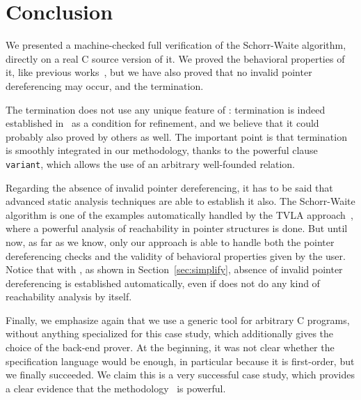 \section{Conclusion}
\label{sec:conclusion}

We presented a machine-checked full verification of the Schorr-Waite
algorithm, directly on a real C source version of it. We 
proved the behavioral properties of it, like previous
works~\cite{bornat00mpc,mehta03cade,abrial03fme}, but we have also
proved that no invalid pointer dereferencing may occur, and the
termination.

The termination does not use any unique feature of \caduceus{}:
termination is indeed established in~\cite{abrial03fme} as a condition
for refinement, and we believe that it could probably also proved by
others as well. The important point is that termination is smoothly
integrated in our methodology, thanks to the powerful clause
\texttt{variant}, which allows the use of an arbitrary well-founded
relation.

Regarding the absence of invalid pointer dereferencing, it has to be
said that advanced static analysis techniques are able to establish it
also. The Schorr-Waite algorithm is one of the examples automatically
handled by the TVLA approach~\cite{sagiv02toplas,reps03esop}, where a powerful
analysis of reachability in pointer structures is done. But until now,
as far as we know, only our approach is able to handle both the pointer
dereferencing checks and the validity of behavioral properties given
by the user. Notice that with \caduceus, as shown in
Section~\ref{sec:simplify}, absence of invalid pointer dereferencing
is established automatically, even if \caduceus{} does not do any kind of
reachability analysis by itself.

Finally, we emphasize again that we use a generic tool for arbitrary C
programs, without anything specialized for this case study, which
additionally gives the choice of the back-end prover. At the
beginning, it was not clear whether the \caduceus{} specification
language would be enough, in particular because it is first-order, but
we finally succeeded.  We claim this is a very successful case study,
which provides a clear evidence that the \caduceus{}
methodology~\cite{filliatre04icfem} is powerful.

